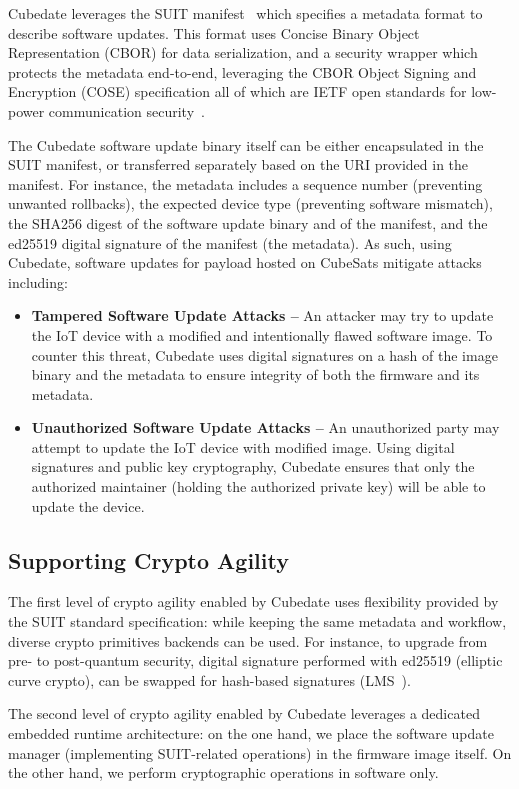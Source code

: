 Cubedate leverages the SUIT manifest~\cite{suit-manifest} which specifies a metadata
format to describe software updates. This format uses Concise Binary Object Representation
(CBOR) for data serialization, and a security wrapper which protects the metadata end-to-end,
leveraging the CBOR Object Signing and Encryption (COSE) specification \-\- all of which are IETF
open standards for low-power communication security~\cite{tschofenig2019cyberphysical}.

The Cubedate software update binary itself can be either encapsulated in the SUIT manifest, or transferred
separately based on the URI provided in the manifest. For instance, the metadata includes a sequence number
(preventing unwanted rollbacks), the expected device type (preventing software mismatch), the SHA256 digest
of the software update binary and of the manifest, and the ed25519 digital signature of the manifest (the metadata).
As such, using Cubedate, software updates for payload hosted on CubeSats mitigate attacks including:

\begin{itemize}
\item {\bf Tampered Software Update Attacks –} An attacker may try to update the IoT device with a
modified and intentionally flawed software image. To counter this threat, Cubedate uses digital
signatures on a hash of the image binary and the metadata to ensure integrity of both the firmware
and its metadata.
\item {\bf Unauthorized Software Update Attacks –} An unauthorized party may attempt to update the IoT
device with modified image. Using digital signatures and public key cryptography, Cubedate ensures that
only the authorized maintainer (holding the authorized private key) will be able to update the device.
\end{itemize}

\subsection{Supporting Crypto Agility}
The first level of crypto agility enabled by Cubedate uses flexibility provided by the SUIT standard
specification: while keeping the same metadata and workflow, diverse crypto primitives backends can be
used. For instance, to upgrade from pre- to post-quantum security, digital signature performed with
ed25519 (elliptic curve crypto), can be swapped for hash-based signatures (LMS~\cite{banegas2022quantum-suit}).

The second level of crypto agility enabled by Cubedate leverages a dedicated embedded runtime architecture:
on the one hand, we place the software update manager (implementing SUIT-related operations) in the firmware image itself.
On the other hand, we perform cryptographic operations in software only.

